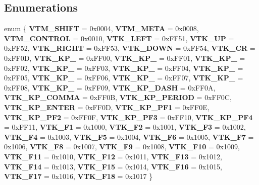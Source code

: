 \subsection*{Enumerations}
\begin{CompactItemize}
\item 
enum \{ {\bf VTM\_\-SHIFT} =  0x0004, 
{\bf VTM\_\-META} =  0x0008, 
{\bf VTM\_\-CONTROL} =  0x0010, 
{\bf VTK\_\-LEFT} =  0x\-FF51, 
{\bf VTK\_\-UP} =  0x\-FF52, 
{\bf VTK\_\-RIGHT} =  0x\-FF53, 
{\bf VTK\_\-DOWN} =  0x\-FF54, 
{\bf VTK\_\-CR} =  0x\-FF0D, 
{\bf VTK\_\-KP\_} =  0x\-FF00, 
{\bf VTK\_\-KP\_} =  0x\-FF01, 
{\bf VTK\_\-KP\_} =  0x\-FF02, 
{\bf VTK\_\-KP\_} =  0x\-FF03, 
{\bf VTK\_\-KP\_} =  0x\-FF04, 
{\bf VTK\_\-KP\_} =  0x\-FF05, 
{\bf VTK\_\-KP\_} =  0x\-FF06, 
{\bf VTK\_\-KP\_} =  0x\-FF07, 
{\bf VTK\_\-KP\_} =  0x\-FF08, 
{\bf VTK\_\-KP\_} =  0x\-FF09, 
{\bf VTK\_\-KP\_\-DASH} =  0x\-FF0A, 
{\bf VTK\_\-KP\_\-COMMA} =  0x\-FF0B, 
{\bf VTK\_\-KP\_\-PERIOD} =  0x\-FF0C, 
{\bf VTK\_\-KP\_\-ENTER} =  0x\-FF0D, 
{\bf VTK\_\-KP\_\-PF1} =  0x\-FF0E, 
{\bf VTK\_\-KP\_\-PF2} =  0x\-FF0F, 
{\bf VTK\_\-KP\_\-PF3} =  0x\-FF10, 
{\bf VTK\_\-KP\_\-PF4} =  0x\-FF11, 
{\bf VTK\_\-F1} =  0x1000, 
{\bf VTK\_\-F2} =  0x1001, 
{\bf VTK\_\-F3} =  0x1002, 
{\bf VTK\_\-F4} =  0x1003, 
{\bf VTK\_\-F5} =  0x1004, 
{\bf VTK\_\-F6} =  0x1005, 
{\bf VTK\_\-F7} =  0x1006, 
{\bf VTK\_\-F8} =  0x1007, 
{\bf VTK\_\-F9} =  0x1008, 
{\bf VTK\_\-F10} =  0x1009, 
{\bf VTK\_\-F11} =  0x1010, 
{\bf VTK\_\-F12} =  0x1011, 
{\bf VTK\_\-F13} =  0x1012, 
{\bf VTK\_\-F14} =  0x1013, 
{\bf VTK\_\-F15} =  0x1014, 
{\bf VTK\_\-F16} =  0x1015, 
{\bf VTK\_\-F17} =  0x1016, 
{\bf VTK\_\-F18} =  0x1017
 \}
\end{CompactItemize}
